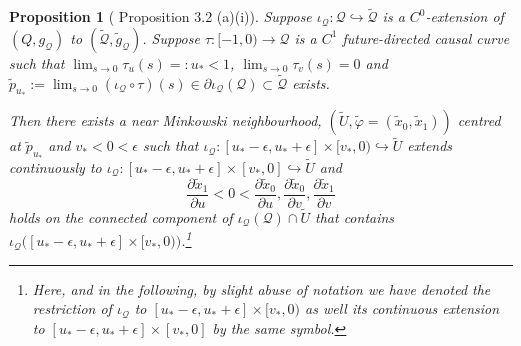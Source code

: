 \documentclass{article}
\newcommand{\Q}{\mathcal{Q}}
\newcommand{\rd}{\partial}
\newtheorem{prop}[definition]{Proposition}
\begin{document}
\begin{prop}[\cite{CameronSbierski} Proposition 3.2 (a)(i)]\label{prop:boundarystructure}
Suppose $\iota_\Q:\Q\hookrightarrow\tilde{\Q}$ is a $C^0$-extension of $(Q,g_\Q)$ to $(\tilde{\Q},\tilde{g}_\Q)$. Suppose $\tau : [-1,0) \to \Q$ is a $C^1$ future-directed causal curve such that  $\lim_{s \to 0} \tau_u(s)=: u_* <1$, $\lim_{s \to 0} \tau_v(s) = 0$ and $\tilde{p}_{u_*}:=\lim_{s \to 0}(\iota_\Q \circ \tau)(s) \in \rd \iota_\Q(\Q) \subset \tilde{\Q}$ exists. 

Then there exists a near Minkowski neighbourhood, $(\tilde{U},\tilde{\varphi}=(\tilde{x}_0,\tilde{x}_1))$ centred at $\tilde{p}_{u_*}$ and $v_*<0<\epsilon$ such that $\iota_{\Q}:[u_*-\epsilon,u_*+\epsilon]\times[v_*,0)\hookrightarrow \tilde{U}$ extends continuously to $\iota_{\Q}:[u_*-\epsilon,u_*+\epsilon]\times[v_*,0]\hookrightarrow\tilde{U}$ and \begin{equation}\label{eqn:monotonicityconventions}
    \frac{\partial\tilde{x}_1}{\partial u}<0<\frac{\partial\tilde{x}_0}{\partial u},\frac{\partial\tilde{x}_0}{\partial v},\frac{\partial\tilde{x}_1}{\partial v}
\end{equation}
holds on the connected component of $\iota_{\Q}(\Q) \cap \tilde{U}$ that contains $\iota_{\Q}\big([u_* - \epsilon, u_* + \epsilon] \times [v_*,0)\big)$.\footnote{Here, and in the following, by slight abuse of notation we have denoted the restriction of $\iota_{\Q}$ to $[u_*-\epsilon,u_*+\epsilon]\times[v_*,0)$ as well its continuous extension to $[u_*-\epsilon,u_*+\epsilon]\times[v_*,0]$  by the same symbol.}




\end{prop}
\end{document}
